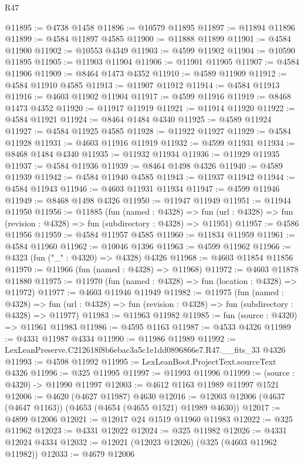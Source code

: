 \begin{lexlean}{R47}
\begin{coremodule}
@11895 := @4738 @1458
@11896 := @10579 @11895
@11897 := @11894 @11896
@11899 := @4584 @11897 @4585
@11900 := @11888 @11899
@11901 := @4584 @11900
@11902 := @10553 @4349
@11903 := @4599 @11902
@11904 := @10590 @11895
@11905 := @11903 @11904
@11906 := @11901 @11905
@11907 := @4584 @11906
@11909 := @8464 @1473 @4352
@11910 := @4589 @11909
@11912 := @4584 @11910 @4585
@11913 := @11907 @11912
@11914 := @4584 @11913
@11916 := @4603 @11902 @11904
@11917 := @4599 @11916
@11919 := @8468 @1473 @4352
@11920 := @11917 @11919
@11921 := @11914 @11920
@11922 := @4584 @11921
@11924 := @8464 @1484 @4340
@11925 := @4589 @11924
@11927 := @4584 @11925 @4585
@11928 := @11922 @11927
@11929 := @4584 @11928
@11931 := @4603 @11916 @11919
@11932 := @4599 @11931
@11934 := @8468 @1484 @4340
@11935 := @11932 @11934
@11936 := @11929 @11935
@11937 := @4584 @11936
@11939 := @8464 @1498 @4326
@11940 := @4589 @11939
@11942 := @4584 @11940 @4585
@11943 := @11937 @11942
@11944 := @4584 @11943
@11946 := @4603 @11931 @11934
@11947 := @4599 @11946
@11949 := @8468 @1498 @4326
@11950 := @11947 @11949
@11951 := @11944 @11950
@11956 := @11885
    (fun (named : @4328) =>
    fun (url : @4328) => fun (revision : @4328) => fun (subdirectory : @4328) => @11951)
@11957 := @4586 @11956
@11959 := @4584 @11957 @4585
@11960 := @11834 @11959
@11961 := @4584 @11960
@11962 := @10046 @1396
@11963 := @4599 @11962
@11966 := @4323 (fun ("_" : @4320) => @4328) @4326
@11968 := @4603 @11854 @11856
@11970 := @11966 (fun (named : @4328) => @11968)
@11972 := @4603 @11878 @11880
@11975 := @11970 (fun (named : @4328) => fun (location : @4328) => @11972)
@11977 := @4603 @11946 @11949
@11982 := @11975
    (fun (named : @4328) =>
    fun (url : @4328) => fun (revision : @4328) => fun (subdirectory : @4328) => @11977)
@11983 := @11963 @11982
@11985 := fun (source : @4320) => @11961 @11983
@11986 := @4595 @1163
@11987 := @4533 @4326
@11989 := @4331 @11987 @4334
@11990 := @11986 @11989
@11992 := LexLeanPreserve.C212618f8b6ebac3a5c1e1dd0896866e7.R47.__fits_33 @4326
@11993 := @4598 @11992
@11995 := LexLeanBoot.ProjectText.sourceText @4326
@11996 := @325 @11995
@11997 := @11993 @11996
@11999 := (source : @4320) -> @11990 @11997
@12003 := @4612 @1163 @11989 @11997 @1521
@12006 := @4620 (@4627 @11987) @4630
@12016 := @12003 @12006 (@4637 (@4647 @1163)) (@4653 (@4654 (@4655 @1521) @11989 @4630))
@12017 := @4899 @12006
@12021 := @12017 @24 @1519 @11960 @11983
@12022 := @325 @11962
@12023 := @4331 @12022
@12024 := @325 @11982
@12026 := @4331 @12024 @4334
@12032 := @12021 (@12023 @12026) (@325 (@4603 @11962 @11982))
@12033 := @4679 @12006

\end{coremodule}
\end{lexlean}
